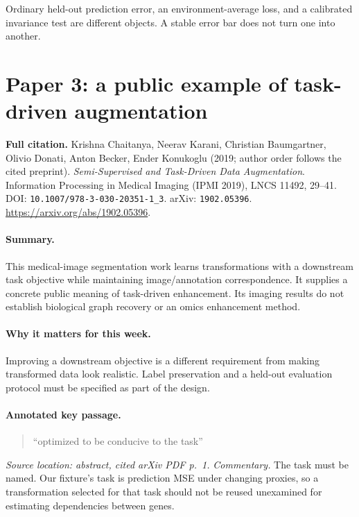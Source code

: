 \documentclass[11pt]{scrartcl}
\begin{document}
\begin{pitfall}
Ordinary held-out prediction error, an environment-average loss, and a calibrated
invariance test are different objects. A stable error bar does not turn one into another.
\end{pitfall}

\clearpage
\section*{Paper 3: a public example of task-driven augmentation}
\textbf{Full citation.} Krishna Chaitanya, Neerav Karani, Christian Baumgartner,
Olivio Donati, Anton Becker, Ender Konukoglu (2019; author order follows the cited
preprint). \emph{Semi-Supervised and Task-Driven Data Augmentation}.
Information Processing in Medical Imaging (IPMI 2019), LNCS 11492, 29--41.
DOI: \texttt{10.1007/978-3-030-20351-1\_3}. arXiv: \texttt{1902.05396}.
\url{https://arxiv.org/abs/1902.05396}.

\paragraph{Summary.} This medical-image segmentation work learns transformations
with a downstream task objective while maintaining image/annotation correspondence.
It supplies a concrete public meaning of task-driven enhancement. Its imaging results
do not establish biological graph recovery or an omics enhancement method.

\paragraph{Why it matters for this week.} Improving a downstream objective is a
different requirement from making transformed data look realistic. Label preservation
and a held-out evaluation protocol must be specified as part of the design.

\paragraph{Annotated key passage.}
\begin{quote}
``optimized to be conducive to the task''
\end{quote}
\emph{Source location: abstract, cited arXiv PDF p.~1.}
\emph{Commentary.} The task must be named. Our fixture's task is prediction MSE under
changing proxies, so a transformation selected for that task should not be reused
unexamined for estimating dependencies between genes.
\end{document}
